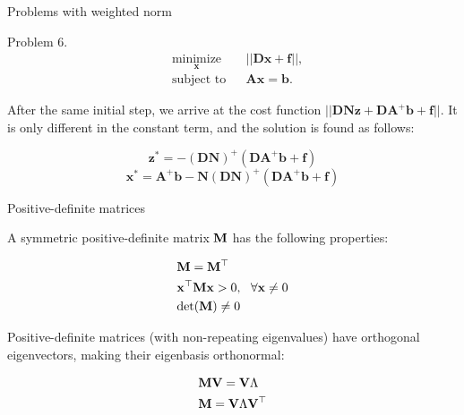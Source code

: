 \documentclass{beamer}
\begin{document}
\begin{frame}{Problems with weighted norm}
	\begin{flushleft}
		
		Problem 6. 
		\begin{equation}
			\begin{aligned}
				& \underset{\mathbf{x}}{\text{minimize}}
				& & || \mathbf{D}\mathbf{x} + \mathbf{f} ||, \\
				& \text{subject to}
				& & \mathbf{A} \mathbf{x} = \mathbf{b}.
			\end{aligned}
		\end{equation}
		
		After the same initial step, we arrive at the cost function $|| \mathbf{D}\mathbf{N}\mathbf{z} + \mathbf{D}\mathbf{A}^+\mathbf{b} + \mathbf{f}||$. It is only different in the constant term, and the solution is found as follows:
		
		
		\begin{equation}
			\mathbf{z}^* = -(\mathbf{D}\mathbf{N})^+ (\mathbf{D}\mathbf{A}^+\mathbf{b} + \mathbf{f})
		\end{equation}
		\begin{equation}
			\mathbf{x}^* = \mathbf{A}^+\mathbf{b}-\mathbf{N}(\mathbf{D}\mathbf{N})^+ (\mathbf{D}\mathbf{A}^+\mathbf{b} + \mathbf{f})
		\end{equation}
		
		
	\end{flushleft}
\end{frame}




\begin{frame}{Positive-definite matrices}
	\begin{flushleft}
		
		A symmetric positive-definite matrix $\mathbf{M}$ has the following properties:
		
		\begin{align}
			&\mathbf{M} = \mathbf{M}^\top
			\\
			&\mathbf{x}^\top \mathbf{M} \mathbf{x} > 0, \ \ \forall \mathbf{x} \neq 0
			\\
			& \text{det}(\mathbf{M}) \neq 0
		\end{align}
		
		Positive-definite matrices (with non-repeating eigenvalues) have orthogonal eigenvectors, making their eigenbasis orthonormal:
		
		\begin{align}
			& \mathbf{M} \mathbf{V} = \mathbf{V} \Lambda  
			\\
			& \mathbf{M} = \mathbf{V} \Lambda \mathbf{V}^\top 
		\end{align}
		
	\end{flushleft}
\end{frame}
\end{document}
